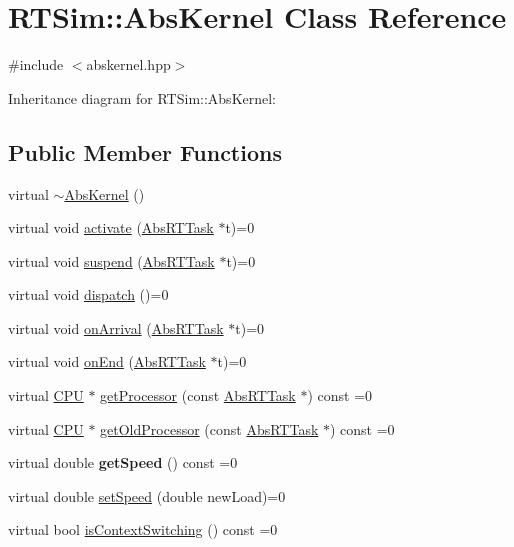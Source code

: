 \hypertarget{classRTSim_1_1AbsKernel}{}\section{R\+T\+Sim\+:\+:Abs\+Kernel Class Reference}
\label{classRTSim_1_1AbsKernel}


{\ttfamily \#include $<$abskernel.\+hpp$>$}



Inheritance diagram for R\+T\+Sim\+:\+:Abs\+Kernel\+:
\subsection*{Public Member Functions}
\begin{DoxyCompactItemize}
\item 
virtual \hyperlink{classRTSim_1_1AbsKernel_a95dfc89a0d57114bf8fe17adfd7b8e7f}{$\sim$\+Abs\+Kernel} ()
\item 
virtual void \hyperlink{classRTSim_1_1AbsKernel_a046cdfcc244a266c8a8d7dd9af0a72fa}{activate} (\hyperlink{classRTSim_1_1AbsRTTask}{Abs\+R\+T\+Task} $\ast$t)=0
\item 
virtual void \hyperlink{classRTSim_1_1AbsKernel_abdd7e9a6b00559870675d92a1f8c150e}{suspend} (\hyperlink{classRTSim_1_1AbsRTTask}{Abs\+R\+T\+Task} $\ast$t)=0
\item 
virtual void \hyperlink{classRTSim_1_1AbsKernel_a29fab5d7ee3a481cec66f806ba823098}{dispatch} ()=0
\item 
virtual void \hyperlink{classRTSim_1_1AbsKernel_a17a0e68b2a00117beaf78fe0f57ed37a}{on\+Arrival} (\hyperlink{classRTSim_1_1AbsRTTask}{Abs\+R\+T\+Task} $\ast$t)=0
\item 
virtual void \hyperlink{classRTSim_1_1AbsKernel_a4f851da0832c325ba8d0ae7744cede48}{on\+End} (\hyperlink{classRTSim_1_1AbsRTTask}{Abs\+R\+T\+Task} $\ast$t)=0
\item 
virtual \hyperlink{classRTSim_1_1CPU}{C\+PU} $\ast$ \hyperlink{classRTSim_1_1AbsKernel_a03749f0af85a6bb857569131c1f628f8}{get\+Processor} (const \hyperlink{classRTSim_1_1AbsRTTask}{Abs\+R\+T\+Task} $\ast$) const =0
\item 
virtual \hyperlink{classRTSim_1_1CPU}{C\+PU} $\ast$ \hyperlink{classRTSim_1_1AbsKernel_a9ea84933a3ce4e6b1a2dd114429d1971}{get\+Old\+Processor} (const \hyperlink{classRTSim_1_1AbsRTTask}{Abs\+R\+T\+Task} $\ast$) const =0
\item 
virtual double {\bfseries get\+Speed} () const =0\hypertarget{classRTSim_1_1AbsKernel_a6f8093f5db1ca98f570154bc4a26c0af}{}\label{classRTSim_1_1AbsKernel_a6f8093f5db1ca98f570154bc4a26c0af}

\item 
virtual double \hyperlink{classRTSim_1_1AbsKernel_a7620a0196c742f3b722498f05987e0ca}{set\+Speed} (double new\+Load)=0
\item 
virtual bool \hyperlink{classRTSim_1_1AbsKernel_aa807b5abf438398cb6bd5c895af7d517}{is\+Context\+Switching} () const =0
\end{DoxyCompactItemize}


